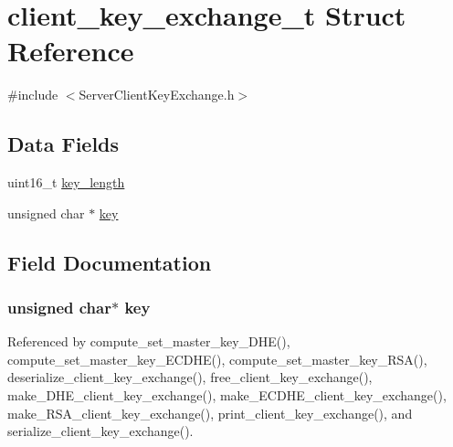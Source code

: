 \hypertarget{structclient__key__exchange__t}{}\section{client\+\_\+key\+\_\+exchange\+\_\+t Struct Reference}
\label{structclient__key__exchange__t}


{\ttfamily \#include $<$Server\+Client\+Key\+Exchange.\+h$>$}

\subsection*{Data Fields}
\begin{DoxyCompactItemize}
\item 
uint16\+\_\+t \hyperlink{structclient__key__exchange__t_aaca3c65525352f552124c3d947b60dcb}{key\+\_\+length}
\item 
unsigned char $\ast$ \hyperlink{structclient__key__exchange__t_a1cb5ee363f3d6d0f548eb6e64d72a7c8}{key}
\end{DoxyCompactItemize}


\subsection{Field Documentation}
\subsubsection[{\texorpdfstring{key}{key}}]{\setlength{\rightskip}{0pt plus 5cm}unsigned char$\ast$ key}\hypertarget{structclient__key__exchange__t_a1cb5ee363f3d6d0f548eb6e64d72a7c8}{}\label{structclient__key__exchange__t_a1cb5ee363f3d6d0f548eb6e64d72a7c8}


Referenced by compute\+\_\+set\+\_\+master\+\_\+key\+\_\+\+D\+H\+E(), compute\+\_\+set\+\_\+master\+\_\+key\+\_\+\+E\+C\+D\+H\+E(), compute\+\_\+set\+\_\+master\+\_\+key\+\_\+\+R\+S\+A(), deserialize\+\_\+client\+\_\+key\+\_\+exchange(), free\+\_\+client\+\_\+key\+\_\+exchange(), make\+\_\+\+D\+H\+E\+\_\+client\+\_\+key\+\_\+exchange(), make\+\_\+\+E\+C\+D\+H\+E\+\_\+client\+\_\+key\+\_\+exchange(), make\+\_\+\+R\+S\+A\+\_\+client\+\_\+key\+\_\+exchange(), print\+\_\+client\+\_\+key\+\_\+exchange(), and serialize\+\_\+client\+\_\+key\+\_\+exchange().


